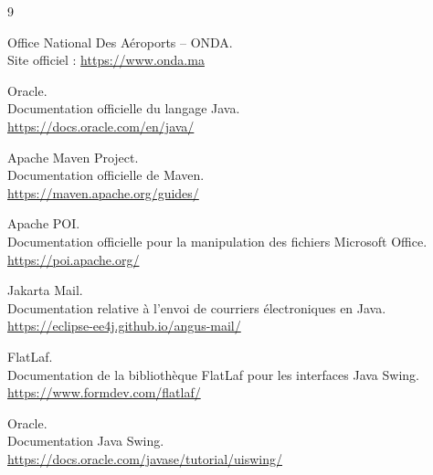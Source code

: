 \documentclass[12pt,a4paper,openany]{report}
\begin{document}
\begin{thebibliography}{9}

Office National Des Aéroports -- ONDA.\\
Site officiel : \url{https://www.onda.ma}

Oracle.\\
Documentation officielle du langage Java.\\
\url{https://docs.oracle.com/en/java/}

Apache Maven Project.\\
Documentation officielle de Maven.\\
\url{https://maven.apache.org/guides/}

Apache POI.\\
Documentation officielle pour la manipulation des fichiers Microsoft Office.\\
\url{https://poi.apache.org/}

Jakarta Mail.\\
Documentation relative à l'envoi de courriers électroniques en Java.\\
\url{https://eclipse-ee4j.github.io/angus-mail/}

FlatLaf.\\
Documentation de la bibliothèque FlatLaf pour les interfaces Java Swing.\\
\url{https://www.formdev.com/flatlaf/}

Oracle.\\
Documentation Java Swing.\\
\url{https://docs.oracle.com/javase/tutorial/uiswing/}

\end{thebibliography}
\end{document}

